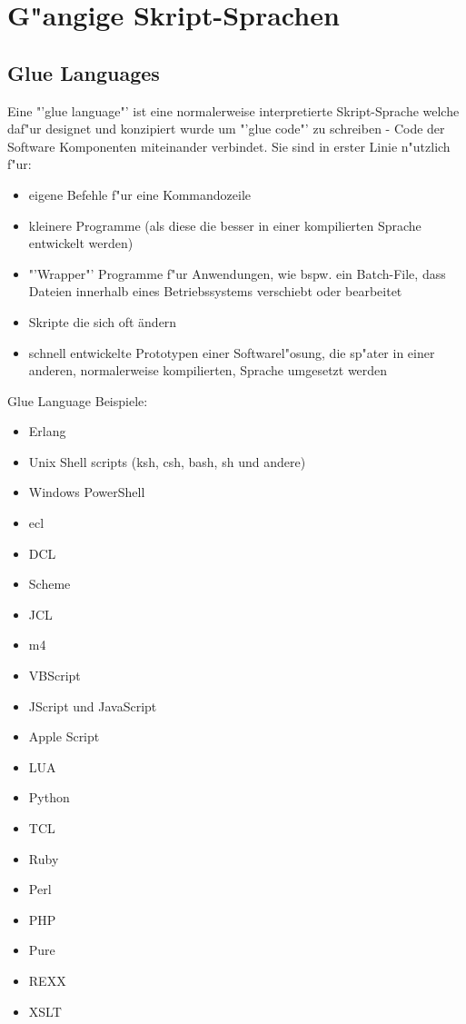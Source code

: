 \documentclass[a4paper,12pt]{scrreprt}
\begin{document}
\section{G"angige Skript-Sprachen}
\subsection{Glue Languages}
Eine "'glue language"' ist eine normalerweise interpretierte Skript-Sprache welche daf"ur designet und konzipiert wurde um "'glue code"' zu schreiben - Code der Software Komponenten miteinander verbindet. Sie sind in erster Linie n"utzlich f"ur:
\begin{itemize}
\item eigene Befehle f"ur eine Kommandozeile
\item kleinere Programme (als diese die besser in einer kompilierten Sprache entwickelt werden)
\item "'Wrapper"' Programme f"ur Anwendungen, wie bspw. ein Batch-File, dass Dateien innerhalb eines Betriebssystems verschiebt oder bearbeitet
\item Skripte die sich oft ändern
\item schnell entwickelte Prototypen einer Softwarel"osung, die sp"ater in einer anderen, normalerweise kompilierten, Sprache umgesetzt werden
\end{itemize}
Glue Language Beispiele:

\begin{itemize}
\item Erlang
\item Unix Shell scripts (ksh, csh, bash, sh und andere)
\item Windows PowerShell
\item ecl
\item DCL
\item Scheme
\item JCL
\item m4
\item VBScript
\item JScript und JavaScript
\item Apple Script
\item LUA
\item Python
\item TCL
\item Ruby
\item Perl
\item PHP
\item Pure
\item REXX
\item XSLT
\end{itemize}
\cite{scrip1} 
\end{document}
